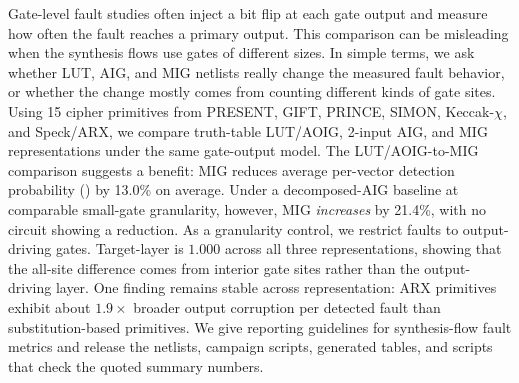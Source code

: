 Gate-level fault studies often inject a bit flip at each gate output and
measure how often the fault reaches a primary output. This comparison can
be misleading when the synthesis flows use gates of different sizes. In
simple terms, we ask whether LUT, AIG, and MIG netlists really change the
measured fault behavior, or whether the change mostly comes from counting
different kinds of gate sites. Using 15 cipher primitives from PRESENT,
GIFT, PRINCE, SIMON, Keccak-$\chi$, and Speck/ARX, we compare
truth-table LUT/AOIG, 2-input AIG, and MIG representations under the same
gate-output \bitflip{} model. The LUT/AOIG-to-MIG comparison suggests a
benefit: MIG reduces average per-vector detection probability (\AvgDP{})
by 13.0\% on average. Under a decomposed-AIG baseline at comparable
small-gate granularity, however, MIG \emph{increases} \AvgDP{} by
21.4\%, with no circuit showing a reduction. As a granularity control,
we restrict faults to output-driving gates. Target-layer \AvgDP{} is
$1.000$ across all three representations, showing that the all-site
difference comes from interior gate sites rather than the output-driving
layer. One finding remains stable across representation: ARX primitives
exhibit about $1.9\times$ broader output corruption per detected fault
than substitution-based primitives. We give reporting guidelines for
synthesis-flow fault metrics and release the netlists, campaign scripts,
generated tables, and scripts that check the quoted summary numbers.
